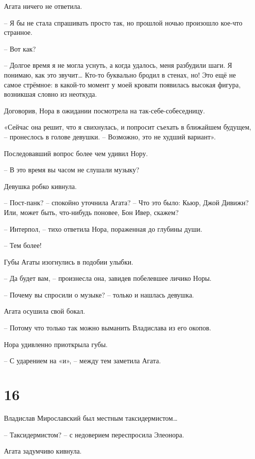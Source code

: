 \documentclass[
  a5paperpaper,
  DIV=11,
  numbers=noendperiod]{scrreprt}
\begin{document}
Агата ничего не ответила.

-- Я бы не стала спрашивать просто так, но прошлой ночью произошло
кое-что странное.

-- Вот как?

-- Долгое время я не могла уснуть, а когда удалось, меня разбудили шаги.
Я понимаю, как это звучит\ldots{} Кто-то буквально бродил в стенах, но!
Это ещё не самое стрёмное: в какой-то момент у моей кровати появилась
высокая фигура, возникшая словно из неоткуда.

Договорив, Нора в ожидании посмотрела на так-себе-собеседницу.

«Сейчас она решит, что я свихнулась, и попросит съехать в ближайшем
будущем, -- пронеслось в голове девушки. -- Возможно, это не худший
вариант».

Последовавший вопрос более чем удивил Нору.

-- В это время вы часом не слушали музыку?

Девушка робко кивнула.

-- Пост-панк? -- спокойно уточнила Агата? -- Что это было: Кьюр, Джой
Дивижн? Или, может быть, что-нибудь поновее, Бон Ивер, скажем?

-- Интерпол, -- тихо ответила Нора, пораженная до глубины души.

-- Тем более!

Губы Агаты изогнулись в подобии улыбки.

-- Да будет вам, -- произнесла она, завидев побелевшее личико Норы.

-- Почему вы спросили о музыке? -- только и нашлась девушка.

Агата осушила свой бокал.

-- Потому что только так можно выманить Владислава из его окопов.

Нора удивленно приоткрыла губы.

-- С ударением на «и», -- между тем заметила Агата.

\section*{16}\label{16}


Владислав Мирославский был местным таксидермистом\ldots{}

-- Таксидермистом? -- с недоверием переспросила Элеонора.

Агата задумчиво кивнула.
\end{document}
